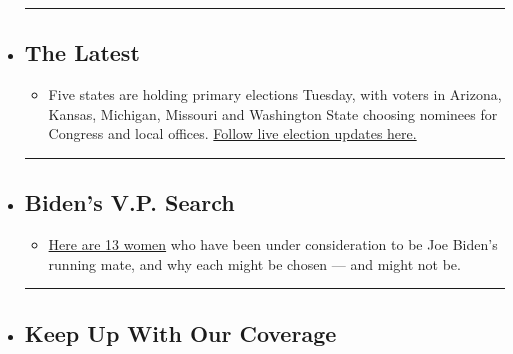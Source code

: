 \begin{itemize}
\item
  \begin{center}\rule{0.5\linewidth}{\linethickness}\end{center}

  \hypertarget{the-latest}{%
  \subsection{The Latest}\label{the-latest}}

  \begin{itemize}
  \tightlist
  \item
    Five states are holding primary elections Tuesday, with voters in
    Arizona, Kansas, Michigan, Missouri and Washington State choosing
    nominees for Congress and local offices.
    \href{https://www.nytimes.com/2020/08/04/us/elections/primary-election-michigan-arizona-kansas.html?action=click\&pgtype=Article\&state=default\&region=BELOW_MAIN_CONTENT\&context=storylines_guide}{Follow
    live election updates here.}
  \end{itemize}
\item
  \begin{center}\rule{0.5\linewidth}{\linethickness}\end{center}

  \hypertarget{bidens-vp-search}{%
  \subsection{Biden's V.P. Search}\label{bidens-vp-search}}

  \begin{itemize}
  \tightlist
  \item
    \href{https://www.nytimes.com/article/biden-vice-president-2020.html?action=click\&pgtype=Article\&state=default\&region=BELOW_MAIN_CONTENT\&context=storylines_guide}{Here
    are 13 women} who have been under consideration to be Joe Biden's
    running mate, and why each might be chosen --- and might not be.
  \end{itemize}
\item
  \begin{center}\rule{0.5\linewidth}{\linethickness}\end{center}

  \hypertarget{keep-up-with-our-coverage}{%
  \subsection{Keep Up With Our
  Coverage}\label{keep-up-with-our-coverage}}


\end{itemize}
